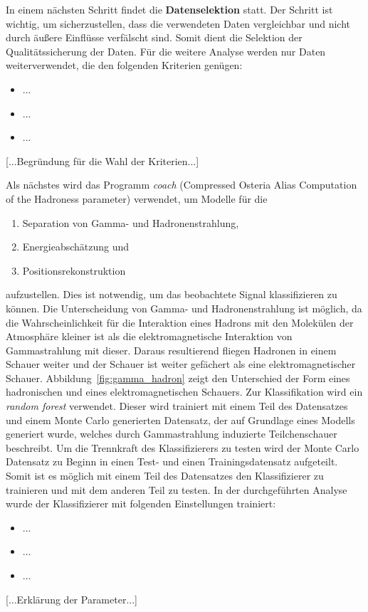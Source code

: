 In einem nächsten Schritt findet die \textbf{Datenselektion} statt. Der Schritt
ist wichtig, um sicherzustellen, dass die verwendeten Daten vergleichbar und
nicht durch äußere Einflüsse verfälscht sind. Somit dient die Selektion der
Qualitätssicherung der Daten. Für die weitere Analyse werden nur Daten
weiterverwendet, die den folgenden Kriterien genügen:
\begin{itemize}
  \item ...
  \item ...
  \item ...
\end{itemize}
[...Begründung für die Wahl der Kriterien...]

Als nächstes wird das Programm \textit{coach} (Compressed Osteria Alias
Computation of the Hadroness parameter) verwendet, um Modelle für die
\begin{enumerate}
  \item Separation von Gamma- und Hadronenstrahlung,
  \item Energieabschätzung und
  \item Positionsrekonstruktion
\end{enumerate}
aufzustellen. Dies ist notwendig, um das beobachtete Signal klassifizieren zu
können. Die Unterscheidung von Gamma- und Hadronenstrahlung ist möglich, da die
Wahrscheinlichkeit für die Interaktion eines Hadrons mit den Molekülen der
Atmosphäre kleiner ist als die elektromagnetische Interaktion von Gammastrahlung
mit dieser. Daraus resultierend fliegen Hadronen in einem Schauer weiter und der
Schauer ist weiter gefächert als eine elektromagnetischer Schauer.
Abbildung~\ref{fig:gamma_hadron} zeigt den Unterschied der Form eines
hadronischen und eines elektromagnetischen Schauers. Zur Klassifikation wird ein
\textit{random forest} verwendet. Dieser wird trainiert mit einem Teil des
Datensatzes und einem Monte Carlo generierten Datensatz, der auf Grundlage eines
Modells generiert wurde, welches durch Gammastrahlung induzierte Teilchenschauer
beschreibt. Um die Trennkraft des Klassifizierers zu testen wird der Monte
Carlo Datensatz zu Beginn in einen Test- und einen Trainingsdatensatz
aufgeteilt. Somit ist es möglich mit einem Teil des Datensatzes den
Klassifizierer zu trainieren und mit dem anderen Teil zu testen. In der
durchgeführten Analyse wurde der Klassifizierer mit folgenden Einstellungen
trainiert:
\begin{itemize}
  \item ...
  \item ...
  \item ...
\end{itemize}
[...Erklärung der Parameter...]

